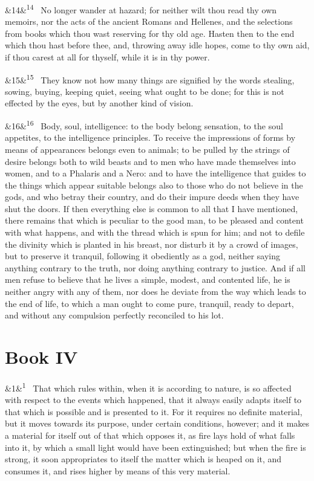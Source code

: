\documentclass[12pt]{article}
\newcommand{\para}[1][]{\par\noindent\ifx&#1&\else\textsuperscript{\footnotesize #1}~\fi}
\begin{document}
\para[14] No longer wander at hazard; for neither wilt thou read thy own
memoirs, nor the acts of the ancient Romans and Hellenes, and the
selections from books which thou wast reserving for thy old age.
Hasten then to the end which thou hast before thee, and, throwing away
idle hopes, come to thy own aid, if thou carest at all for thyself,
while it is in thy power.

\para[15] They know not how many things are signified by the words stealing,
sowing, buying, keeping quiet, seeing what ought to be done; for this is
not effected by the eyes, but by another kind of vision.

\para[16] Body, soul, intelligence: to the body belong sensation, to the soul
appetites, to the intelligence principles. To receive the impressions of
forms by means of appearances belongs even to animals; to be pulled by
the strings of desire belongs both to wild beasts and to men who have
made themselves into women, and to a Phalaris and a Nero: and to have
the intelligence that guides to the things which appear suitable belongs
also to those who do not believe in the gods, and who betray their
country, and do their impure deeds when they have shut the doors. If
then everything else is common to all that I have mentioned, there
remains that which is peculiar to the good man, to be pleased and
content with what happens, and with the thread which is spun for him;
and not to defile the divinity which is planted in his breast, nor
disturb it by a crowd of images, but to preserve it tranquil, following
it obediently as a god, neither saying anything contrary to the truth,
nor doing anything contrary to justice. And if all men refuse to believe
that he lives a simple, modest, and contented life, he is neither angry
with any of them, nor does he deviate from the way which leads to the
end of life, to which a man ought to come pure, tranquil, ready to
depart, and without any compulsion perfectly reconciled to his lot.

\section*{Book IV}

\para[1] That which rules within, when it is according to nature, is so affected
with respect to the events which happened, that it always easily adapts
itself to that which is possible and is presented to it. For it requires
no definite material, but it moves towards its purpose, under certain
conditions, however; and it makes a material for itself out of that
which opposes it, as fire lays hold of what falls into it, by which a
small light would have been extinguished; but when the fire is strong,
it soon appropriates to itself the matter which is heaped on it, and
consumes it, and rises higher by means of this very material.
\end{document}
